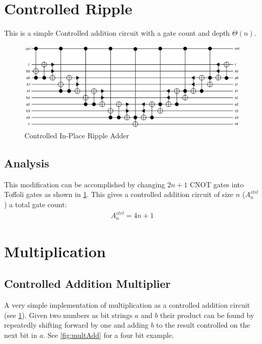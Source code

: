 \section{Controlled Ripple}
    This is a simple Controlled addition circuit with a gate count and depth $\Theta(n)$.
    \begin{figure}[ht]
      \capstart
      \centering
      \includegraphics[width=\textwidth]{images/4BitRippleAdderCtrl}
      \caption{Controlled In-Place Ripple Adder}
      \label{fig:ctrlRipple}
    \end{figure}
    \subsection{Analysis}
      This modification can be accomplished by changing $2n+1$ CNOT gates into Toffoli gates as shown in \cref{fig:ctrlRipple}.
 		  This gives a controlled addition circuit of size $n$ ($A^{ctrl}_n$) a total gate count:
      \begin{align} \label{eq:cadd}
        A^{ctrl}_n = 4n+1
      \end{align}


\section{Multiplication}
  \subsection{Controlled Addition Multiplier}
    A very simple implementation of multiplication as a controlled addition circuit (see \cref{fig:ctrlRipple}).
    Given two numbers as bit strings $a$ and $b$ their product can be found by repeatedly shifting forward by one and adding $b$ to the result controlled on the next bit in $a$.
    See \cref{fig:multAdd} for a four bit example.

